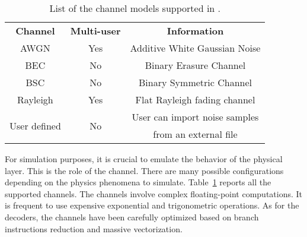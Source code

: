 \begin{table}[htp]
  \centering
  \caption{List of the channel models supported in \AFFECT.}
  \label{tab:aff3ct_features_channels}
  \begin{tabular}{ c | c | c }
  \multirow{2}{*}{\textbf{Channel}}      & \multirow{2}{*}{\textbf{Multi-user}} & \multirow{2}{*}{\textbf{Information}}          \\
                                         &                                      &                                                \\
  \hline
  \hline
  \multirow{2}{*}{{AWGN}}                & \multirow{2}{*}{Yes}                 & \multirow{2}{*}{Additive White Gaussian Noise} \\
                                         &                                      &                                                \\
  \hline
  \multirow{2}{*}{{BEC}}                 & \multirow{2}{*}{No}                  & \multirow{2}{*}{Binary Erasure Channel}        \\
                                         &                                      &                                                \\
  \hline
  \multirow{2}{*}{{BSC}}                 & \multirow{2}{*}{No}                  & \multirow{2}{*}{Binary Symmetric Channel}      \\
                                         &                                      &                                                \\
  \hline
  \multirow{2}{*}{{Rayleigh}}            & \multirow{2}{*}{Yes}                 & \multirow{2}{*}{Flat Rayleigh fading channel}  \\
                                         &                                      &                                                \\
  \hline
  \multirow{2}{*}{{User defined}}        & \multirow{2}{*}{No}                  & User can import noise samples                  \\
                                         &                                      & from an external file                          \\
  \end{tabular}
\end{table}

For simulation purposes, it is crucial to emulate the behavior of the physical
layer. This is the role of the channel. There are many possible configurations
depending on the physics phenomena to simulate.
Table~\ref{tab:aff3ct_features_channels} reports all the supported channels. The
channels involve complex floating-point computations. It is frequent to use
expensive exponential and trigonometric operations. As for the decoders, the
channels have been carefully optimized based on branch instructions reduction
and massive vectorization.

